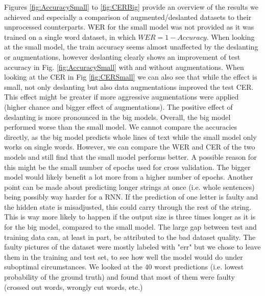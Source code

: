\documentclass{article}
\begin{document}
Figures \ref{fig:AccuracySmall} to \ref{fig:CERBig} provide an overview of the results we achieved and especially a comparison of augmented/deslanted datasets to their unprocessed counterparts. WER for the small model was not provided as it was trained on a single word dataset, in which $WER = 1 - Accuracy$. When looking at the small model, the train accuracy seems almost unaffected by the deslanting or augmentations, however deslanting clearly shows an improvement of test accuracy in Fig. \ref{fig:AccuracySmall} with and without augmentations. When looking at the CER in Fig \ref{fig:CERSmall} we can also see that while the effect is small, not only deslanting but also data augmentations improved the test CER. This effect might be greater if more aggressive augmentations were applied (higher chance and bigger effect of augmentations). The positive effect of deslanting is more pronounced in the big models. Overall, the big model performed worse than the small model. We cannot compare the accuracies directly, as the big model predicts whole lines of text while the small model only works on single words. However, we can compare the WER and CER of the two models and still find that the small model performs better. A possible reason for this might be the small number of epochs used for cross validation. The bigger model would likely benefit a lot more from a higher number of epochs. Another point can be made about predicting longer strings at once (i.e. whole sentences) being possibly way harder for a RNN. If the prediction of one letter is faulty and the hidden state is misadjusted, this could carry through the rest of the string. This is way more likely to happen if the output size is three times longer as it is for the big model, compared to the small model. The large gap between test and training data can, at least in part, be attributed to the bad dataset quality. The faulty pictures of the dataset were mostly labeled with "err" but we chose to leave them in the training and test set, to see how well the model would do under suboptimal circumstances. We looked at the 40 worst predictions (i.e. lowest probability of the ground truth) and found that most of them were faulty (crossed out words, wrongly cut words, etc.)
\end{document}
